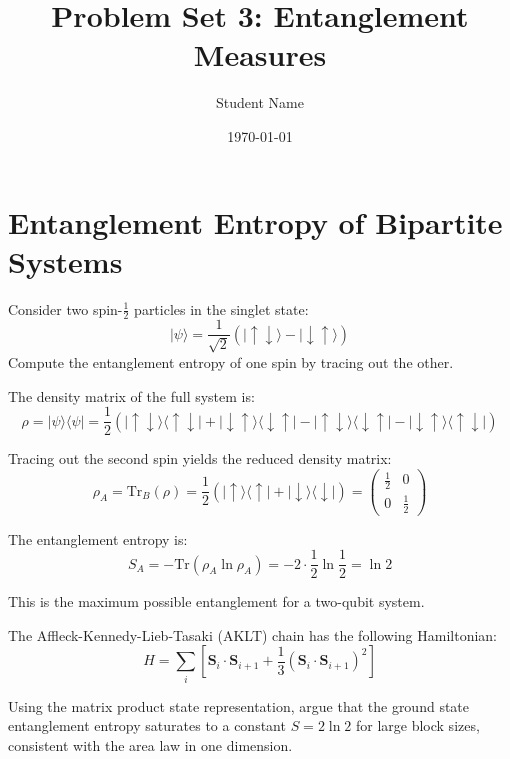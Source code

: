 \documentclass[assignment]{academic-report}
\title{Problem Set 3: Entanglement Measures}
\author{Student Name}
\date{\today}
\begin{document}
\maketitle

\section{Entanglement Entropy of Bipartite Systems}

\begin{problem}
Consider two spin-$\frac{1}{2}$ particles in the singlet state:
\begin{equation}
  |\psi\rangle = \frac{1}{\sqrt{2}}\left(|\uparrow\downarrow\rangle -
  |\downarrow\uparrow\rangle\right)
\end{equation}
Compute the entanglement entropy of one spin by tracing out the other.
\end{problem}

\begin{solution}
The density matrix of the full system is:
\begin{equation}
  \rho = |\psi\rangle\langle\psi| =
  \frac{1}{2}\left(|\uparrow\downarrow\rangle\langle\uparrow\downarrow| +
  |\downarrow\uparrow\rangle\langle\downarrow\uparrow| -
  |\uparrow\downarrow\rangle\langle\downarrow\uparrow| -
  |\downarrow\uparrow\rangle\langle\uparrow\downarrow|\right)
\end{equation}

Tracing out the second spin yields the reduced density matrix:
\begin{equation}
  \rho_A = \mathrm{Tr}_B(\rho) =
  \frac{1}{2}\left(|\uparrow\rangle\langle\uparrow| +
  |\downarrow\rangle\langle\downarrow|\right) =
  \begin{pmatrix} \frac{1}{2} & 0 \\ 0 & \frac{1}{2} \end{pmatrix}
\end{equation}

The entanglement entropy is:
\begin{equation}
  S_A = -\mathrm{Tr}(\rho_A \ln \rho_A) =
  -2 \cdot \frac{1}{2}\ln\frac{1}{2} = \ln 2
\end{equation}

This is the maximum possible entanglement for a two-qubit system.
\end{solution}

\begin{problem}
The Affleck-Kennedy-Lieb-Tasaki (AKLT) chain has the following Hamiltonian:
\begin{equation}
  H = \sum_i \left[\mathbf{S}_i \cdot \mathbf{S}_{i+1} +
  \frac{1}{3}(\mathbf{S}_i \cdot \mathbf{S}_{i+1})^2\right]
\end{equation}

Using the matrix product state representation, argue that the ground state
entanglement entropy saturates to a constant $S = 2\ln 2$ for large block
sizes, consistent with the area law in one dimension.
\end{problem}
\end{document}
